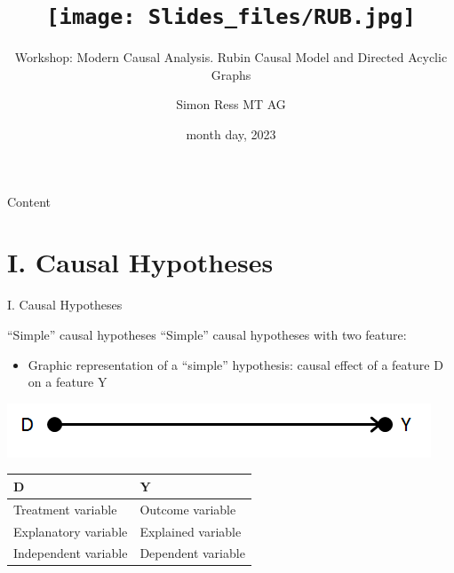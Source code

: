 \documentclass[
  ignorenonframetext,
]{beamer}
\title{\texttt{[image: Slides\_files/RUB.jpg]}}
\subtitle{Workshop: Modern Causal Analysis. Rubin Causal Model and
Directed Acyclic Graphs}
\author{Simon Ress \textbar{} MT AG}
\date{month day, 2023}
\providecommand{\tightlist}{%
  \setlength{\itemsep}{0pt}\setlength{\parskip}{0pt}}
\begin{document}
\frame{\titlepage}

\begin{frame}{Content}
\protect\hypertarget{content}{}
\tableofcontents[]
\end{frame}

\hypertarget{i.-causal-hypotheses}{%
\section{I. Causal Hypotheses}\label{i.-causal-hypotheses}}

\begin{frame}{I. Causal Hypotheses}
\end{frame}

\begin{frame}{``Simple'' causal hypotheses}
\protect\hypertarget{simple-causal-hypotheses}{}
``Simple'' causal hypotheses with two feature:

\begin{itemize}
\tightlist
\item
  Graphic representation of a ``simple'' hypothesis: causal effect of a
  feature D on a feature Y
\end{itemize}

\includegraphics{Graphics/D_on_Y.png}

\begin{longtable}[]{@{}ll@{}}
\toprule()
\textbf{D} & \textbf{Y} \\
\midrule()
\endhead
Treatment variable & Outcome variable \\
Explanatory variable & Explained variable \\
Independent variable & Dependent variable \\
\bottomrule()
\end{longtable}
\end{frame}
\end{document}
